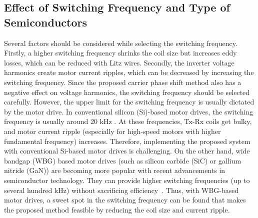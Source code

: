 \documentclass[journal]{IEEEtran}
\begin{document}
\vspace{-2mm}
\subsection{Effect of Switching Frequency and Type of Semiconductors}
Several factors should be considered while selecting the switching frequency.  
Firstly, a higher switching frequency shrinks the coil size but increases eddy losses, which can be reduced with Litz wires.
Secondly, the inverter voltage harmonics create motor current ripples, which can be decreased by increasing the switching frequency.
Since the proposed carrier phase shift method also has a negative effect on voltage harmonics, the switching frequency should be selected carefully.
However, the upper limit for the switching frequency is usually dictated by the motor drive.
In conventional silicon (Si)-based motor drives, the switching frequency is usually around 20 kHz \cite{motor_si-based}.
At these frequencies, Tx-Rx coils get bulky, and motor current ripple (especially for high-speed motors with higher fundamental frequency) increases. 
Therefore, implementing the proposed system with conventional Si-based motor drives is challenging. 
On the other hand, wide bandgap (WBG) based motor drives (such as silicon carbide (SiC) or gallium nitride (GaN)) are becoming more popular with recent advancements in semiconductor technology.
They can provide higher switching frequencies (up to several hundred kHz) without sacrificing efficiency~\cite{gan_drive,gan_driver2}.
Thus, with WBG-based motor drives,  a sweet spot in the switching frequency can be found that makes the proposed method feasible by reducing the coil size and current ripple.
\vspace*{-2mm}
\end{document}
